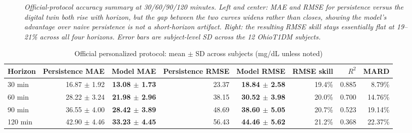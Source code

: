 \documentclass[journal]{IEEEtran}
\begin{document}
\begin{figure}[t]
\centering
{}

\caption{\small\textit{Official-protocol accuracy summary at 30/60/90/120 minutes. Left and center: MAE and RMSE for persistence versus the digital twin both rise with horizon, but the gap between the two curves widens rather than closes, showing the model's advantage over naive persistence is not a short-horizon artifact. Right: the resulting RMSE skill stays essentially flat at 19--21\% across all four horizons. Error bars are subject-level SD across the 12 OhioT1DM subjects.}}
\label{fig:summary}
\end{figure}

\begin{table}[t]
\centering
\caption{Official personalized protocol: mean $\pm$ SD across subjects (mg/dL unless noted)}
\label{tab:official}
\footnotesize
\begin{tabular}{lrrrrrrr}
\toprule
Horizon & Persistence MAE & Model MAE & Persistence RMSE & Model RMSE & RMSE skill & $R^2$ & MARD \\
\midrule
30 min & 16.87 $\pm$ 1.92 & \textbf{13.08 $\pm$ 1.73} & 23.37 & \textbf{18.84 $\pm$ 2.58} & 19.4\% & 0.885 & 8.79\% \\
60 min & 28.22 $\pm$ 3.24 & \textbf{21.98 $\pm$ 2.96} & 38.15 & \textbf{30.52 $\pm$ 3.98} & 20.0\% & 0.700 & 14.76\% \\
90 min & 36.55 $\pm$ 4.00 & \textbf{28.42 $\pm$ 3.89} & 48.69 & \textbf{38.60 $\pm$ 5.05} & 20.7\% & 0.523 & 19.14\% \\
120 min & 42.90 $\pm$ 4.46 & \textbf{33.23 $\pm$ 4.45} & 56.43 & \textbf{44.46 $\pm$ 5.62} & 21.2\% & 0.368 & 22.37\% \\
\bottomrule
\end{tabular}
\end{table}
\end{document}
